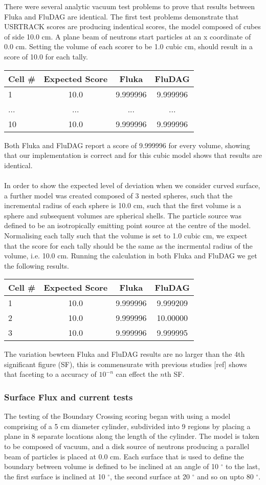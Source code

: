\documentclass{anstrans}
\begin{document}
There were several analytic vacuum test problems to prove that results between Fluka and FluDAG are identical. The first test problems demonstrate that USRTRACK scores are producing indentical scores, the model composed of cubes of side 10.0 cm. A plane beam of neutrons start particles at an x coordinate of 0.0 cm. Setting the volume of each scorer to be 1.0 cubic cm, should result in a score of 10.0 for each tally.

\begin{tabular}{l|c|c|c}
Cell \# & Expected Score & Fluka  & FluDAG \\
\hline
1 & 10.0 & 9.999996 & 9.999996 \\
... & ... & ... & ... \\
10 & 10.0 & 9.999996 & 9.999996 \\
\end{tabular}

Both Fluka and FluDAG report a score of 9.999996 for every volume, showing that our implementation 
is correct and for this cubic model shows that results are identical. 
\\
\\
In order to show the expected level of deviation when we consider curved surface, a further model was created composed of 3 nested spheres, such that the incremental radius of each sphere is 10.0 cm, such that the first volume is a sphere and subsequent volumes are spherical shells. The particle source was defined to be an isotropically emitting point source at the centre of the model. Normalising each tally such that the volume is set to 1.0 cubic cm, we expect that the score for each tally should be the same as the incrmental radius of the volume, i.e. 10.0 cm. Running the calculation in both Fluka and FluDAG we get the following results.
\begin{tabular}{l|c|c|c}
Cell \# & Expected Score & Fluka  & FluDAG \\
\hline
1 & 10.0 & 9.999996 & 9.999209 \\
2 & 10.0 & 9.999996 & 10.00000 \\
3 & 10.0 & 9.999996 & 9.999995 \\
\end{tabular}
The variation bewteen Fluka and FluDAG results are no larger than the 4th significant figure (SF), this is commensurate with previous studies [ref] shows that faceting to a accuracy of $10^{-n}$ can effect the $n$th SF.

\subsubsection*{Surface Flux and current tests}
The testing of the Boundary Crossing scoring began with using a model comprising of a 5 cm diameter cylinder, subdivided into 9 regions by placing a plane in 8 separate locations along the length of the cylinder. The model is taken to be composed of vacuum, and a disk source of neutrons producing a parallel beam of particles is placed at 0.0 cm. Each surface that is used to define the boundary between volume is defined to be inclined at an angle of 10 $^{\circ}$ to the last, the first surface is inclined at 10 $^{\circ}$, the second surface at 20 $^{\circ}$ and so on upto 80 $^{\circ}$.
\end{document}
